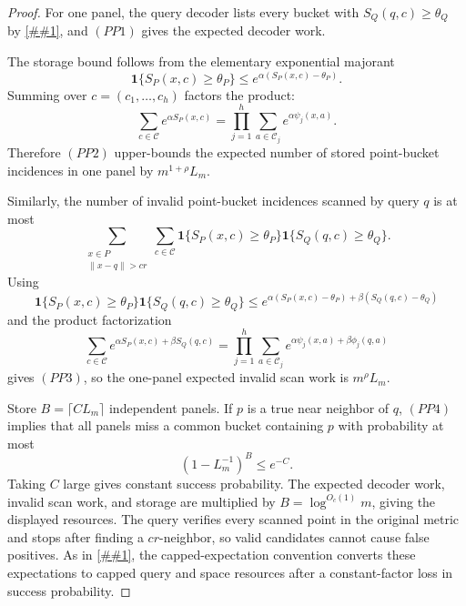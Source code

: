 \documentclass[10pt]{article}
\newcommand{\cref}[1]{\ref{##1}}
\theoremstyle{definition}
\begin{document}
\begin{proof}
   For one panel, the query decoder lists every bucket with
   \(S_Q(q,c)\ge\theta_Q\) by \cref{lem:additive-product-panel-decoder}, and
   \((PP1)\) gives the expected decoder work.

   The storage bound follows from the elementary exponential majorant
   \[
      \mathbf 1\{S_P(x,c)\ge\theta_P\}
      \le e^{\alpha(S_P(x,c)-\theta_P)} .
   \]
   Summing over \(c=(c_1,\ldots,c_h)\) factors the product:
   \[
      \sum_{c\in\mathcal C}e^{\alpha S_P(x,c)}
      =
      \prod_{j=1}^h\sum_{a\in\mathcal C_j}e^{\alpha\psi_j(x,a)}.
   \]
   Therefore \((PP2)\) upper-bounds the expected number of stored point-bucket
   incidences in one panel by \(m^{1+\rho}L_m\).

   Similarly, the number of invalid point-bucket incidences scanned by query
   \(q\) is at most
   \[
      \sum_{\substack{x\in P\\ \|x-q\|>cr}}
      \sum_{c\in\mathcal C}
      \mathbf 1\{S_P(x,c)\ge\theta_P\}
      \mathbf 1\{S_Q(q,c)\ge\theta_Q\}.
   \]
   Using
   \[
      \mathbf 1\{S_P(x,c)\ge\theta_P\}
      \mathbf 1\{S_Q(q,c)\ge\theta_Q\}
      \le
      e^{\alpha(S_P(x,c)-\theta_P)+
         \beta(S_Q(q,c)-\theta_Q)}
   \]
   and the product factorization
   \[
      \sum_{c\in\mathcal C}e^{\alpha S_P(x,c)+\beta S_Q(q,c)}
      =
      \prod_{j=1}^h
      \sum_{a\in\mathcal C_j}
      e^{\alpha\psi_j(x,a)+\beta\phi_j(q,a)}
   \]
   gives \((PP3)\), so the one-panel expected invalid scan work is
   \(m^\rho L_m\).

   Store \(B=\lceil C L_m\rceil\) independent panels.  If \(p\) is a true near
   neighbor of \(q\), \((PP4)\) implies that all panels miss a common bucket
   containing \(p\) with probability at most
   \[
      (1-L_m^{-1})^B\le e^{-C}.
   \]
   Taking \(C\) large gives constant success probability.  The expected decoder
   work, invalid scan work, and storage are multiplied by \(B=\log^{O_c(1)}m\),
   giving the displayed resources.  The query verifies every scanned point in
   the original metric and stops after finding a \(cr\)-neighbor, so valid
   candidates cannot cause false positives.  As in
   \cref{prop:flat-spherical-code-terminal}, the capped-expectation convention
   converts these expectations to capped query and space resources after a
   constant-factor loss in success probability.
\end{proof}
\end{document}
